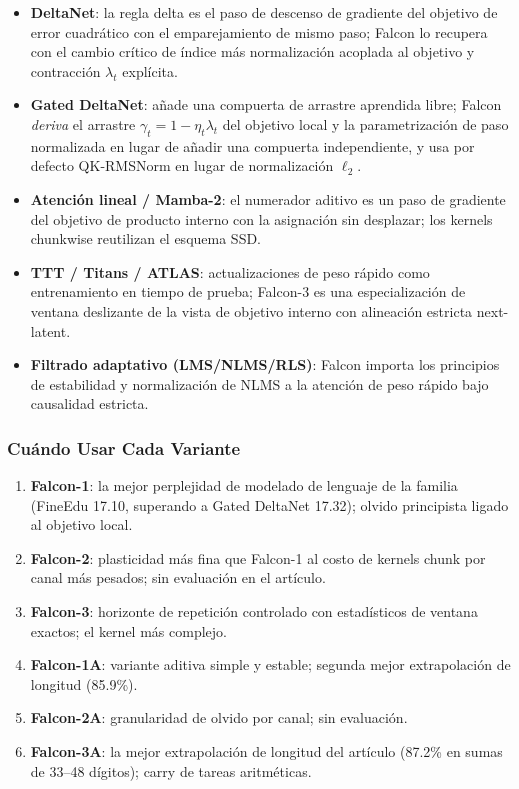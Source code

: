 \begin{itemize}[leftmargin=*]
    \item \textbf{DeltaNet}: la regla delta es el paso de descenso de gradiente del objetivo de error cuadrático con el emparejamiento de mismo paso; Falcon lo recupera con el cambio crítico de índice más normalización acoplada al objetivo y contracción $\lambda_t$ explícita.
    \item \textbf{Gated DeltaNet}: añade una compuerta de arrastre aprendida libre; Falcon \emph{deriva} el arrastre $\gamma_t = 1 - \eta_t \lambda_t$ del objetivo local y la parametrización de paso normalizada en lugar de añadir una compuerta independiente, y usa por defecto QK-RMSNorm en lugar de normalización $\ell_2$.
    \item \textbf{Atención lineal / Mamba-2}: el numerador aditivo es un paso de gradiente del objetivo de producto interno con la asignación sin desplazar; los kernels chunkwise reutilizan el esquema SSD.
    \item \textbf{TTT / Titans / ATLAS}: actualizaciones de peso rápido como entrenamiento en tiempo de prueba; Falcon-3 es una especialización de ventana deslizante de la vista de objetivo interno con alineación estricta next-latent.
    \item \textbf{Filtrado adaptativo (LMS/NLMS/RLS)}: Falcon importa los principios de estabilidad y normalización de NLMS a la atención de peso rápido bajo causalidad estricta.
\end{itemize}

\subsubsection{Cuándo Usar Cada Variante}

\begin{enumerate}[leftmargin=*]
    \item \textbf{Falcon-1}: la mejor perplejidad de modelado de lenguaje de la familia (FineEdu 17.10, superando a Gated DeltaNet 17.32); olvido principista ligado al objetivo local.
    \item \textbf{Falcon-2}: plasticidad más fina que Falcon-1 al costo de kernels chunk por canal más pesados; sin evaluación en el artículo.
    \item \textbf{Falcon-3}: horizonte de repetición controlado con estadísticos de ventana exactos; el kernel más complejo.
    \item \textbf{Falcon-1A}: variante aditiva simple y estable; segunda mejor extrapolación de longitud (85.9\%).
    \item \textbf{Falcon-2A}: granularidad de olvido por canal; sin evaluación.
    \item \textbf{Falcon-3A}: la mejor extrapolación de longitud del artículo (87.2\% en sumas de 33--48 dígitos); carry de tareas aritméticas.
\end{enumerate}